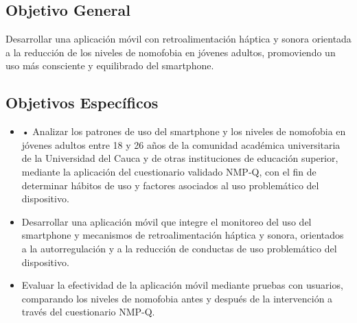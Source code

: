 \subsection{Objetivo General}

Desarrollar una aplicación móvil con retroalimentación háptica y sonora orientada a la reducción de los niveles de nomofobia en jóvenes adultos, promoviendo un uso más consciente y equilibrado del smartphone.

\subsection{Objetivos Específicos}

\begin{itemize}
    \item •	Analizar los patrones de uso del smartphone y los niveles de nomofobia en jóvenes adultos entre 18 y 26 años de la comunidad académica universitaria de la Universidad del Cauca y de otras instituciones de educación superior, mediante la aplicación del cuestionario validado NMP-Q, con el fin de determinar hábitos de uso y factores asociados al uso problemático del dispositivo.
    \item Desarrollar una aplicación móvil que integre el monitoreo del uso del smartphone y mecanismos de retroalimentación háptica y sonora, orientados a la autorregulación y a la reducción de conductas de uso problemático del dispositivo.
    \item Evaluar la efectividad de la aplicación móvil mediante pruebas con usuarios, comparando los niveles de nomofobia antes y después de la intervención a través del cuestionario NMP-Q.
\end{itemize}